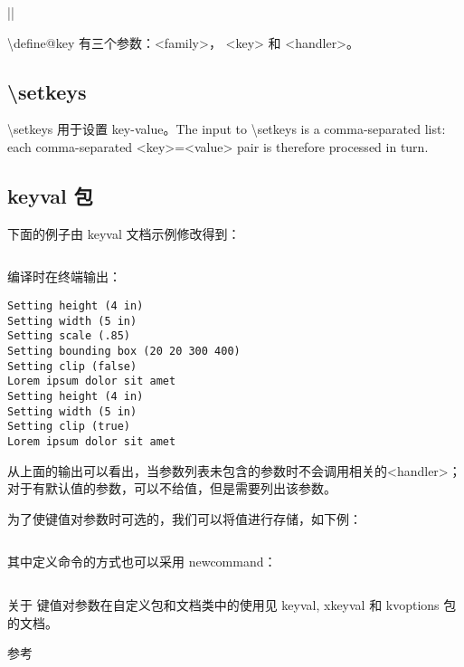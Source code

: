 ||

{\ttfamily \textbackslash define@key} 有三个参数：{\ttfamily <family>}，
{\ttfamily <key>} 和 {\ttfamily <handler>}。

\subsection{{\ttfamily \textbackslash setkeys}}

{\ttfamily \textbackslash setkeys} 用于设置 key-value。The input to {\ttfamily \textbackslash setkeys} is a comma-separated list: each comma-separated {\ttfamily <key>=<value>} pair is therefore processed in turn. 

\subsection{ keyval 包}

下面的例子由 keyval 文档示例修改得到：

\inputminted[linenos]{latex}{examples/programming/keyval-commands-with-parameters.tex}

编译时在终端输出：

\begin{verbatim}
Setting height (4 in)
Setting width (5 in)
Setting scale (.85)
Setting bounding box (20 20 300 400)
Setting clip (false)
Lorem ipsum dolor sit amet
Setting height (4 in)
Setting width (5 in)
Setting clip (true)
Lorem ipsum dolor sit amet
\end{verbatim}

从上面的输出可以看出，当参数列表未包含的参数时不会调用相关的{\ttfamily <handler>}；
对于有默认值的参数，可以不给值，但是需要列出该参数。

为了使键值对参数时可选的，我们可以将值进行存储，如下例：

\inputminted[linenos]{latex}{examples/programming/keyval-commands-with-optional-parameters1.tex}

其中定义命令的方式也可以采用 {\ttfamily newcommand}：

\inputminted[firstline=30,lastline=42]{latex}{examples/programming/keyval-commands-with-optional-parameters2.tex}

关于 键值对参数在自定义包和文档类中的使用见 keyval, xkeyval 和 kvoptions 包的文档。
 
参考\cite{WIKIBOOKS}

